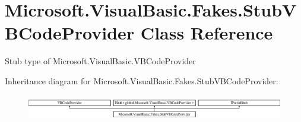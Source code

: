 \hypertarget{class_microsoft_1_1_visual_basic_1_1_fakes_1_1_stub_v_b_code_provider}{\section{Microsoft.\-Visual\-Basic.\-Fakes.\-Stub\-V\-B\-Code\-Provider Class Reference}
\label{class_microsoft_1_1_visual_basic_1_1_fakes_1_1_stub_v_b_code_provider}
}


Stub type of Microsoft.\-Visual\-Basic.\-V\-B\-Code\-Provider 


Inheritance diagram for Microsoft.\-Visual\-Basic.\-Fakes.\-Stub\-V\-B\-Code\-Provider\-:\begin{figure}[H]
\begin{center}
\leavevmode
\includegraphics[height=1.121121cm]{class_microsoft_1_1_visual_basic_1_1_fakes_1_1_stub_v_b_code_provider}
\end{center}
\end{figure}
